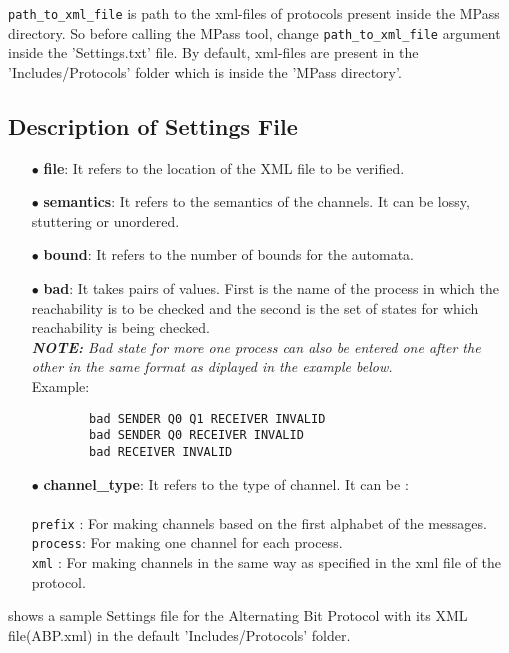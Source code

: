 {\tt path\_to\_xml\_file} is path to the xml-files of protocols present inside the MPass directory. So before calling the MPass tool, change {\tt path\_to\_xml\_file} argument inside the 'Settings.txt' file. By default, xml-files are present in the 'Includes/Protocols' folder which is inside the 'MPass directory'.


\subsection{Description of Settings File}
\begin{itemize}
\item[$\bullet$] {\bf file}: It refers to the location of the XML file to be verified.

\item[$\bullet$] {\bf semantics}: It refers to the semantics of the channels. It can be lossy, stuttering or unordered.

\item[$\bullet$] {\bf bound}: It refers to the number of bounds for the automata.

\item[$\bullet$] {\bf bad}: It takes pairs of values. First is the name of the process in which the reachability is to be checked and the second is the  set of states for which reachability is being checked.\\
\emph{{\bf NOTE: }Bad state for more one process can also be entered one after the other in the same format as diplayed in the example below.}\\

Example:
\begin{verbatim}
        bad SENDER Q0 Q1 RECEIVER INVALID
        bad SENDER Q0 RECEIVER INVALID
        bad RECEIVER INVALID
\end{verbatim}

\item[$\bullet$] {\bf channel\_type}: It refers to the type of channel. It can be :\\\\
{\tt prefix} : For making channels based on the first alphabet of the messages.\\
{\tt process}: For making one channel for each process.\\
{\tt xml} : For making channels in the same way as specified in the xml file of the protocol.
\end{itemize}
\pagebreak
{} shows a sample Settings file for the Alternating Bit Protocol with its XML file(ABP.xml) in the default 'Includes/Protocols' folder.

